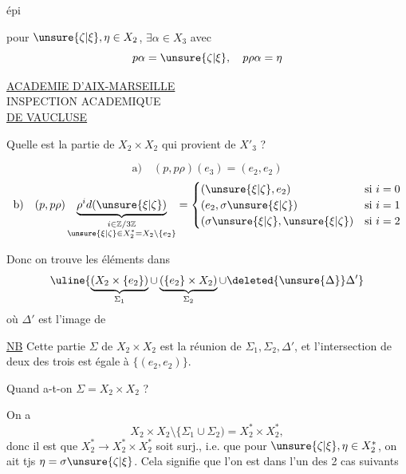 épi


pour $\unsure{\zeta|\xi},\eta\in X_2$, $\exists\alpha\in X_3$ avec
\[
p\alpha=\unsure{\zeta|\xi},\quad p\rho\alpha=\eta
\]


\begin{center}
\uline{ACADEMIE D'AIX-MARSEILLE}\\
INSPECTION ACADEMIQUE\\
\uline{DE VAUCLUSE}
\end{center}

Quelle est la partie de $X_2\times X_2$ qui provient de $X'_3$ ?

\[
\text{a)}\quad(p,p\rho)(e_3)=(e_2,e_2)
\]
\[
\text{b)}\quad(p,p\rho)\underbrace{\rho^i d(\unsure{\xi|\zeta})}_{\substack{i\in\mathbb Z/3\mathbb Z\\\unsure{\xi|\zeta}\in X_2^*=X_2\setminus\{e_2\}}}
=\begin{cases}
(\unsure{\xi|\zeta},e_2)&\text{si }i=0\\
(e_2,\sigma\unsure{\xi|\zeta})&\text{si }i=1\\
(\sigma\unsure{\xi|\zeta},\unsure{\xi|\zeta})&\text{si }i=2
\end{cases}
\]

Donc on trouve les éléments  dans
\[
\uline{\underbrace{(X_2\times\{e_2\})}_{\Sigma_1}\cup\underbrace{(\{e_2\}\times X_2)}_{\Sigma_2}\cup\deleted{\unsure{\Delta}}\Delta'}
\]
où $\Delta'$ est l'image de

\uline{NB} Cette partie $\Sigma$ de $X_2\times X_2$ est la réunion de $\Sigma_1,\Sigma_2,\Delta'$, et l'intersection de deux  des trois est égale à $\{(e_2,e_2)\}$.

Quand a-t-on $\Sigma=X_2\times X_2$ ?

 On a
\[
X_2\times X_2\setminus\{\Sigma_1\cup\Sigma_2)=X_2^*\times X_2^*,
\]
donc il est  que $X_2^*\longrightarrow X_2^*\times X_2^*$ soit surj., i.e. que pour $\unsure{\zeta|\xi},\eta\in X_2^*$, on ait tjs $\eta=\sigma\unsure{\zeta|\xi}$. Cela signifie que l'on est dans l'un des 2 cas suivants

